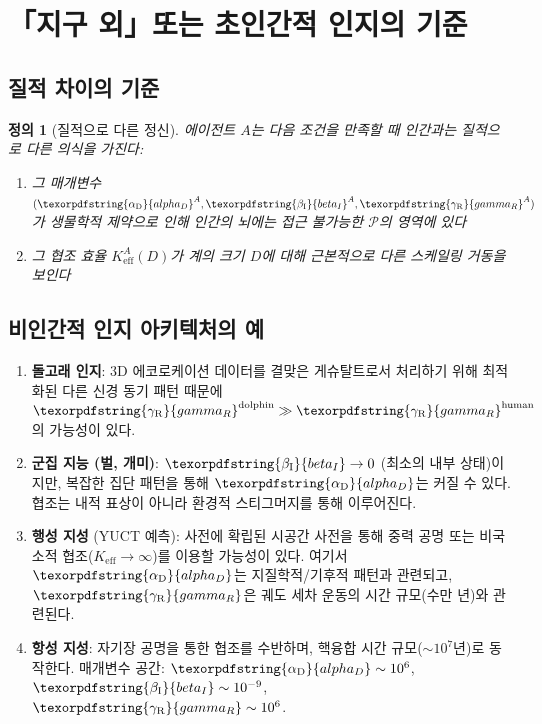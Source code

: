 \documentclass[11pt,a4paper]{article}
\newtheorem{definition}{정의}
\DeclareRobustCommand{\alD}{\texorpdfstring{\ensuremath{\alpha_{\mathrm{D}}}}{alpha_D}}
\DeclareRobustCommand{\beI}{\texorpdfstring{\ensuremath{\beta_{\mathrm{I}}}}{beta_I}}
\DeclareRobustCommand{\gaR}{\texorpdfstring{\ensuremath{\gamma_{\mathrm{R}}}}{gamma_R}}
\newcommand{\eff}{\mathrm{eff}}
\newcommand{\Ke}{K_{\eff}}
\begin{document}
	\section{「지구 외」또는 초인간적 인지의 기준}
	
	\subsection{질적 차이의 기준}
	
	\begin{definition}[질적으로 다른 정신]
		에이전트 \(A\)는 다음 조건을 만족할 때 인간과는 질적으로 다른 의식을 가진다:
		\begin{enumerate}
			\item 그 매개변수 \((\alD^A, \beI^A, \gaR^A)\)가 생물학적 제약으로 인해 인간의 뇌에는 접근 불가능한 \(\mathcal{P}\)의 영역에 있다
			\item 그 협조 효율 \(\Ke^A(D)\)가 계의 크기 \(D\)에 대해 근본적으로 다른 스케일링 거동을 보인다
		\end{enumerate}
	\end{definition}
	
	\subsection{비인간적 인지 아키텍처의 예}
	
	\begin{enumerate}
		\item \textbf{돌고래 인지}: 3D 에코로케이션 데이터를 결맞은 게슈탈트로서 처리하기 위해 최적화된 다른 신경 동기 패턴 때문에 \(\gaR^{\mathrm{dolphin}} \gg \gaR^{\mathrm{human}}\)의 가능성이 있다.
		
		\item \textbf{군집 지능 (벌, 개미)}: \(\beI \to 0\) (최소의 내부 상태)이지만, 복잡한 집단 패턴을 통해 \(\alD\)는 커질 수 있다. 협조는 내적 표상이 아니라 환경적 스티그머지를 통해 이루어진다.
		
		\item \textbf{행성 지성} (YUCT 예측): 사전에 확립된 시공간 사전을 통해 중력 공명 또는 비국소적 협조(\(\Ke \to \infty\))를 이용할 가능성이 있다. 여기서 \(\alD\)는 지질학적/기후적 패턴과 관련되고, \(\gaR\)은 궤도 세차 운동의 시간 규모(수만 년)와 관련된다.
		
		\item \textbf{항성 지성}: 자기장 공명을 통한 협조를 수반하며, 핵융합 시간 규모(\(\sim 10^7\)년)로 동작한다. 매개변수 공간: \(\alD \sim 10^6\), \(\beI \sim 10^{-9}\), \(\gaR \sim 10^6\).
	\end{enumerate}
	
\end{document}
